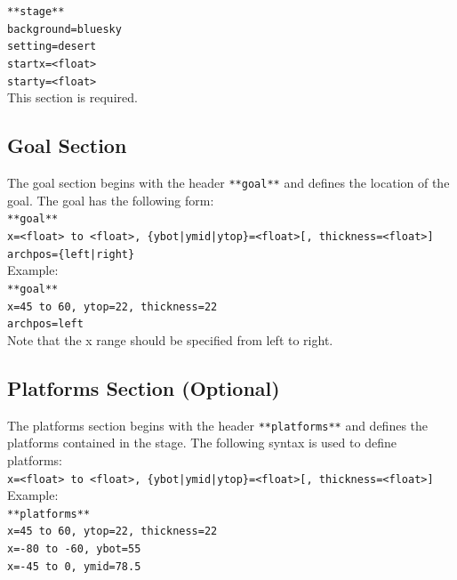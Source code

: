 \documentclass[12pt, titlepage]{article}
\begin{document}
\noindent ${}$\qquad \texttt{**stage**}\\
${}$\qquad \texttt{background=bluesky}\\
${}$\qquad \texttt{setting=desert}\\
${}$\qquad \texttt{startx=<float>}\\
${}$\qquad \texttt{starty=<float>}\\

\noindent This section is required.

\subsection{Goal Section}
The goal section begins with the header \texttt{**goal**} and defines the location of the goal.  The goal has the following form:\\

\noindent ${}$\qquad \texttt{**goal**}\\
${}$\qquad \texttt{x=<float> to <float>, \{ybot|ymid|ytop\}=<float>[, thickness=<float>]}\\
${}$\qquad \texttt{archpos=\{left|right\}}\\

\noindent Example:\\

\noindent ${}$\qquad \texttt{**goal**}\\
${}$\qquad \texttt{x=45 to 60, ytop=22, thickness=22}\\
${}$\qquad \texttt{archpos=left}\\

\noindent Note that the x range should be specified from left to right.

\subsection{Platforms Section (Optional)}
The platforms section begins with the header \texttt{**platforms**} and defines the platforms contained in the stage.  The following syntax is used to define platforms:\\

\noindent ${}$\qquad \texttt{x=<float> to <float>, \{ybot|ymid|ytop\}=<float>[, thickness=<float>]}\\

\noindent Example:\\

\noindent ${}$\qquad \texttt{**platforms**}\\
${}$\qquad \texttt{x=45 to 60, ytop=22, thickness=22}\\
${}$\qquad \texttt{x=-80 to -60, ybot=55}\\
${}$\qquad \texttt{x=-45 to 0, ymid=78.5}\\
\end{document}
